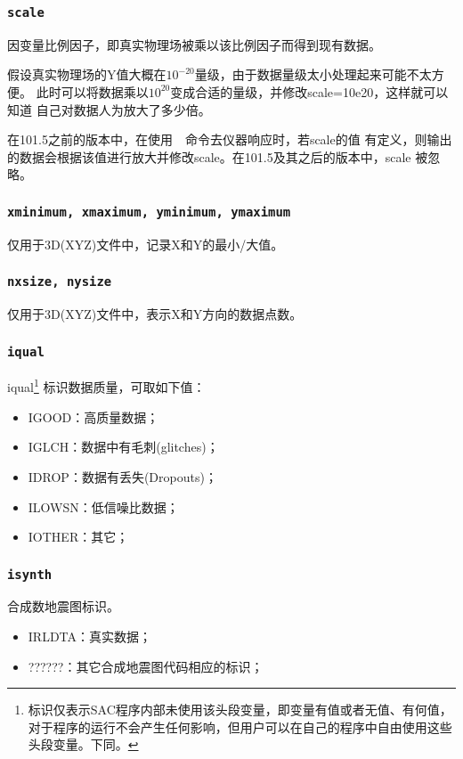 \subsubsection{\texttt{scale}}
因变量比例因子，即真实物理场被乘以该比例因子而得到现有数据。

假设真实物理场的Y值大概在$10^{-20}$量级，由于数据量级太小处理起来可能不太方便。
此时可以将数据乘以$10^{20}$变成合适的量级，并修改scale=10e20，这样就可以知道
自己对数据人为放大了多少倍。

在101.5之前的版本中，在使用~~命令去仪器响应时，若scale的值
有定义，则输出的数据会根据该值进行放大并修改scale。在101.5及其之后的版本中，scale
被忽略。

\subsubsection{\texttt{xminimum, xmaximum, yminimum, ymaximum}}
仅用于3D(XYZ)文件中，记录X和Y的最小/大值。

\subsubsection{\texttt{nxsize, nysize}}
仅用于3D(XYZ)文件中，表示X和Y方向的数据点数。

\subsubsection{\texttt{iqual}\dag}
iqual\footnote{\dag 标识仅表示SAC程序内部未使用该头段变量，即变量有值或者无值、有何值，
对于程序的运行不会产生任何影响，但用户可以在自己的程序中自由使用这些头段变量。下同。
}
标识数据质量，可取如下值：
\begin{itemize}
\ttfamily
\item IGOOD：高质量数据；
\item IGLCH：数据中有毛刺(glitches)；
\item IDROP：数据有丢失(Dropouts)；
\item ILOWSN：低信噪比数据；
\item IOTHER：其它；
\end{itemize}

\subsubsection{\texttt{isynth}\dag}
合成数地震图标识。
\begin{itemize}
\ttfamily
\item IRLDTA：真实数据；
\item ??????：其它合成地震图代码相应的标识；
\end{itemize}

